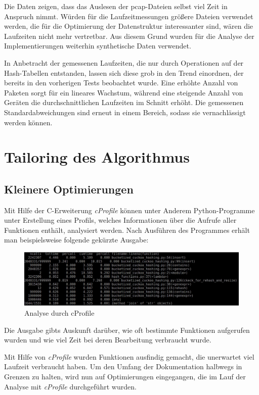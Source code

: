 Die Daten zeigen, dass das Auslesen der pcap-Dateien selbst viel Zeit in Anspruch nimmt. Würden für die Laufzeitmessungen größere Dateien verwendet werden, die für die Optimierung der Datenstruktur interessanter sind, wären die Laufzeiten nicht mehr vertretbar. Aus diesem Grund wurden für die Analyse der Implementierungen weiterhin synthetische Daten verwendet. 

In Anbetracht der gemessenen Laufzeiten, die nur durch Operationen auf der Hash-Tabellen entstanden, lassen sich diese grob in den Trend einordnen, der bereits in den vorherigen Tests beobachtet wurde. Eine erhöhte Anzahl von Paketen sorgt für ein lineares Wachstum, während eine steigende Anzahl von Geräten die durchschnittlichen Laufzeiten im Schnitt erhöht. Die gemessenen Standardabweichungen sind erneut in einem Bereich, sodass sie vernachlässigt werden können.

\chapter{Tailoring des Algorithmus}
\section{Kleinere Optimierungen}
Mit Hilfe der C-Erweiterung \textit{cProfile} können unter Anderem Python-Programme unter Erstellung eines Profils, welches Informationen über die Aufrufe aller Funktionen enthält, analysiert werden. Nach Ausführen des Programmes erhält man beispielsweise folgende gekürzte Ausgabe:
\begin{figure}[H]
	\centering
	\includegraphics[width=1.0\textwidth]{Bilder/cprofiler.jpg}
	\caption{Analyse durch cProfile}
\end{figure}
Die Ausgabe gibts Auskunft darüber, wie oft bestimmte Funktionen aufgerufen wurden und wie viel Zeit bei deren Bearbeitung verbraucht wurde.

Mit Hilfe von \textit{cProfile} wurden Funktionen ausfindig gemacht, die unerwartet viel Laufzeit verbraucht haben. Um den Umfang der Dokumentation halbwegs in Grenzen zu halten, wird nun auf Optimierungen eingegangen, die im Lauf der Analyse mit \textit{cProfile} durchgeführt wurden.

